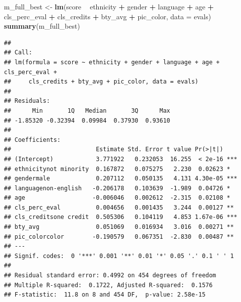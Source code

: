 \documentclass[]{article}
\newenvironment{Shaded}{\begin{snugshade}}{\end{snugshade}}
\newcommand{\KeywordTok}[1]{\textcolor[rgb]{0.13,0.29,0.53}{\textbf{#1}}}
\newcommand{\DataTypeTok}[1]{\textcolor[rgb]{0.13,0.29,0.53}{#1}}
\newcommand{\DecValTok}[1]{\textcolor[rgb]{0.00,0.00,0.81}{#1}}
\newcommand{\StringTok}[1]{\textcolor[rgb]{0.31,0.60,0.02}{#1}}
\newcommand{\OperatorTok}[1]{\textcolor[rgb]{0.81,0.36,0.00}{\textbf{#1}}}
\newcommand{\NormalTok}[1]{#1}
\begin{document}
\begin{Shaded}
\begin{Highlighting}[]
\NormalTok{m_full_best <-}\StringTok{ }\KeywordTok{lm}\NormalTok{(score }\OperatorTok{~}\StringTok{ }\NormalTok{ethnicity }\OperatorTok{+}\StringTok{ }\NormalTok{gender }\OperatorTok{+}\StringTok{ }\NormalTok{language }\OperatorTok{+}\StringTok{ }\NormalTok{age }\OperatorTok{+}\StringTok{ }\NormalTok{cls_perc_eval }
             \OperatorTok{+}\StringTok{ }\NormalTok{cls_credits }\OperatorTok{+}\StringTok{ }\NormalTok{bty_avg }\OperatorTok{+}\StringTok{ }\NormalTok{pic_color, }\DataTypeTok{data =}\NormalTok{ evals)}
\KeywordTok{summary}\NormalTok{(m_full_best)}
\end{Highlighting}
\end{Shaded}

\begin{verbatim}
## 
## Call:
## lm(formula = score ~ ethnicity + gender + language + age + cls_perc_eval + 
##     cls_credits + bty_avg + pic_color, data = evals)
## 
## Residuals:
##      Min       1Q   Median       3Q      Max 
## -1.85320 -0.32394  0.09984  0.37930  0.93610 
## 
## Coefficients:
##                        Estimate Std. Error t value Pr(>|t|)    
## (Intercept)            3.771922   0.232053  16.255  < 2e-16 ***
## ethnicitynot minority  0.167872   0.075275   2.230  0.02623 *  
## gendermale             0.207112   0.050135   4.131 4.30e-05 ***
## languagenon-english   -0.206178   0.103639  -1.989  0.04726 *  
## age                   -0.006046   0.002612  -2.315  0.02108 *  
## cls_perc_eval          0.004656   0.001435   3.244  0.00127 ** 
## cls_creditsone credit  0.505306   0.104119   4.853 1.67e-06 ***
## bty_avg                0.051069   0.016934   3.016  0.00271 ** 
## pic_colorcolor        -0.190579   0.067351  -2.830  0.00487 ** 
## ---
## Signif. codes:  0 '***' 0.001 '**' 0.01 '*' 0.05 '.' 0.1 ' ' 1
## 
## Residual standard error: 0.4992 on 454 degrees of freedom
## Multiple R-squared:  0.1722, Adjusted R-squared:  0.1576 
## F-statistic:  11.8 on 8 and 454 DF,  p-value: 2.58e-15
\end{verbatim}

\begin{Shaded}
\end{Shaded}
\end{document}
